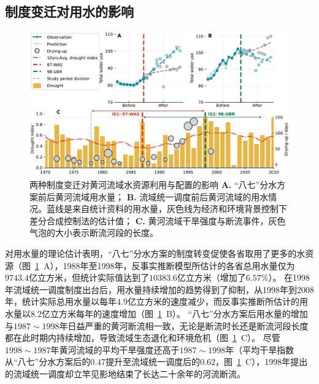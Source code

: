 \subsection{制度变迁对用水的影响}\label{result-2}

\begin{figure}[!htb]
	\centering
	\includegraphics[width=\linewidth]{img/ch5/main_results2.pdf}
	\caption[两种制度变迁对黄河流域水资源利用与配置的影响]{
        两种制度变迁对黄河流域水资源利用与配置的影响
        \textbf{A.} “八七”分水方案前后黄河流域用水量；
        \textbf{B.} 流域统一调度前后黄河流域的用水情况。蓝线是来自统计资料的用水量，灰色线为经济和环境背景控制下差分合成控制法的估计值；
        \textbf{C.} 黄河流域干旱强度与断流事件，灰色气泡的大小表示断流河段的长度。
	}\label{fig:main_results}
\end{figure}

对用水量的理论估计表明，“八七”分水方案的制度转变促使各省取用了更多的水资源（图~\ref{fig:main_results}~A），1988年至1998年，反事实推断模型所估计的各省总用水量仅为$9743.4$亿立方米，但统计实际值达到了$10383.6$亿立方米（增加了$6.57\%$）。
在1998年流域统一调度制度出台后，用水量持续增加的趋势得到了抑制，从1998年到2008年，统计实际总用水量以每年$4.9$亿立方米的速度减少，而反事实推断所估计的用水量以$8.2$亿立方米每年的速度增加（图~\ref{fig:main_results}~B）。
“八七”分水方案后用水量的增加与$1987 \sim 1998$年日益严重的黄河断流相一致，无论是断流时长还是断流河段长度都在此时期内持续增加，导致流域生态退化和环境危机（图~\ref{fig:main_results}~C）。
尽管$1998 \sim 1987$年黄河流域的平均干旱强度还高于$1987 \sim 1998$年（平均干旱指数从“八七”分水方案后的$0.47$提升至流域统一调度后的$0.62$，图~\ref{fig:main_results}~C），1998年提出的流域统一调度却立竿见影地结束了长达二十余年的河流断流。

